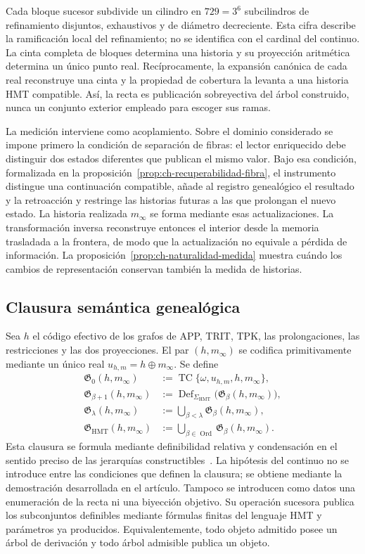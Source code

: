 Cada bloque sucesor subdivide un cilindro en \(729=3^6\) subcilindros de refinamiento disjuntos,
exhaustivos y de diámetro decreciente. Esta cifra describe la ramificación
local del refinamiento; no se identifica con el cardinal del continuo. La
cinta completa de bloques determina una historia y su proyección aritmética
determina un único punto real. Recíprocamente, la expansión canónica de cada
real reconstruye una cinta y la propiedad de cobertura la levanta a una
historia HMT compatible. Así, la recta es publicación sobreyectiva del árbol
construido, nunca un conjunto exterior empleado para escoger sus ramas.

La medición interviene como acoplamiento. Sobre el dominio considerado se
impone primero la condición de separación de fibras: el lector enriquecido
debe distinguir dos estados diferentes que publican el mismo valor. Bajo esa
condición, formalizada en la
proposición~\ref{prop:ch-recuperabilidad-fibra}, el instrumento distingue una
continuación compatible, añade al registro genealógico el resultado y la
retroacción y restringe las historias futuras a las que prolongan el nuevo
estado. La historia realizada \(m_\infty\) se forma mediante esas
actualizaciones. La transformación inversa reconstruye entonces el interior
desde la memoria trasladada a la frontera, de modo que la actualización no
equivale a pérdida de información. La
proposición~\ref{prop:ch-naturalidad-medida} muestra cuándo los cambios de
representación conservan también la medida de historias.

\subsection{Clausura semántica genealógica}

Sea \(h\) el código efectivo de los grafos de APP, TRIT, TPK, las
prolongaciones, las restricciones y las dos proyecciones. El par
\((h,m_\infty)\) se codifica primitivamente mediante un único real
\(u_{h,m}=h\oplus m_\infty\). Se define
\[
 \begin{aligned}
 \mathfrak G_0(h,m_\infty)
   &:=\operatorname{TC}\{\omega,u_{h,m},h,m_\infty\},\\
 \mathfrak G_{\beta+1}(h,m_\infty)
   &:=\operatorname{Def}_{\Sigma_{\mathrm{HMT}}}
        \bigl(\mathfrak G_\beta(h,m_\infty)\bigr),\\
 \mathfrak G_\lambda(h,m_\infty)
   &:=\bigcup_{\beta<\lambda}\mathfrak G_\beta(h,m_\infty),\\
 \mathfrak G_{\mathrm{HMT}}(h,m_\infty)
   &:=\bigcup_{\beta\in\operatorname{Ord}}
        \mathfrak G_\beta(h,m_\infty).
 \end{aligned}
\]
Esta clausura se formula mediante definibilidad relativa y condensación en el
sentido preciso de las jerarquías constructibles~\cite{Jech2003}. La hipótesis
del continuo no se introduce entre las condiciones que definen la clausura; se
obtiene mediante la demostración desarrollada en el artículo. Tampoco se
introducen como datos una enumeración de la recta ni una biyección objetivo. Su
operación sucesora publica los subconjuntos definibles mediante fórmulas finitas
del lenguaje HMT y parámetros ya producidos.
Equivalentemente, todo objeto admitido posee un árbol de derivación y todo
árbol admisible publica un objeto.

